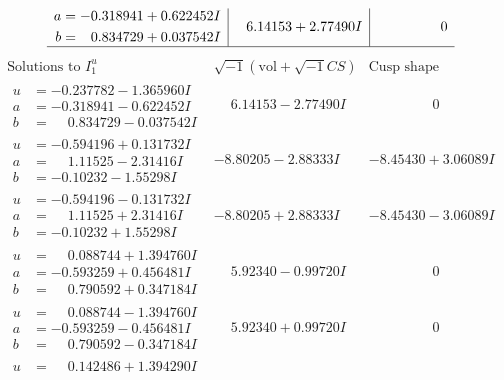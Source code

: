 \documentclass[1p]{elsarticle_modified}
\theoremstyle{definition}
\newcommand{\I}{\sqrt{-1}}
\begin{document}
$$\begin{array}{c|c|c}
\begin{aligned}
a &= -0.318941 + 0.622452 I \\
b &= \phantom{-}0.834729 + 0.037542 I\end{aligned}
 & \phantom{-}6.14153 + 2.77490 I & \phantom{-0.000000 } 0\\
 \hline 
 \end{array}$$\newpage$$\begin{array}{c|c|c}  
\text{Solutions to }I^u_{1}& \I (\text{vol} + \sqrt{-1}CS) & \text{Cusp shape}\\
 \hline 
\begin{aligned}
u &= -0.237782 - 1.365960 I \\
a &= -0.318941 - 0.622452 I \\
b &= \phantom{-}0.834729 - 0.037542 I\end{aligned}
 & \phantom{-}6.14153 - 2.77490 I & \phantom{-0.000000 } 0 \\ \hline\begin{aligned}
u &= -0.594196 + 0.131732 I \\
a &= \phantom{-}1.11525 - 2.31416 I \\
b &= -0.10232 - 1.55298 I\end{aligned}
 & -8.80205 - 2.88333 I & -8.45430 + 3.06089 I \\ \hline\begin{aligned}
u &= -0.594196 - 0.131732 I \\
a &= \phantom{-}1.11525 + 2.31416 I \\
b &= -0.10232 + 1.55298 I\end{aligned}
 & -8.80205 + 2.88333 I & -8.45430 - 3.06089 I \\ \hline\begin{aligned}
u &= \phantom{-}0.088744 + 1.394760 I \\
a &= -0.593259 + 0.456481 I \\
b &= \phantom{-}0.790592 + 0.347184 I\end{aligned}
 & \phantom{-}5.92340 - 0.99720 I & \phantom{-0.000000 } 0 \\ \hline\begin{aligned}
u &= \phantom{-}0.088744 - 1.394760 I \\
a &= -0.593259 - 0.456481 I \\
b &= \phantom{-}0.790592 - 0.347184 I\end{aligned}
 & \phantom{-}5.92340 + 0.99720 I & \phantom{-0.000000 } 0 \\ \hline\begin{aligned}
u &= \phantom{-}0.142486 + 1.394290 I \\

\end{aligned}
\end{array}$$
\end{document}
